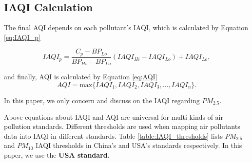 \documentclass[
twocolumn,
]{ceurart}
\begin{document}
\subsection{IAQI Calculation}

The final AQI depends on each pollutant's IAQI, which is calculated by Equation \ref{eq:IAQI_p}

\begin{equation}
    \label{eq:IAQI_p}
    IAQI_p = \frac{C_p-BP_{Lo}}{BP_{Hi}-BP_{Lo}}(IAQI_{Hi}-IAQI_{Lo})+IAQI_{Lo},
\end{equation}

and finally, AQI is calculated by Equation \ref{eq:AQI}
\begin{equation}
    \label{eq:AQI}
    AQI = \text{max}\{IAQI_{1}, IAQI_{2}, IAQI_{3}, ..., IAQI_{n}\}.
\end{equation}

In this paper, we only concern and discuss on the IAQI regarding $PM_{2.5}$.



Above equations about IAQI and AQI are universal for multi kinds of air pollution standards. Different thresholds are used when mapping air pollutants data into IAQI in different standards. Table \ref{table:IAQI_thresholds} lists $PM_{2.5}$ and $PM_{10}$ IAQI thresholds in China's and USA's standards respectively. In this paper, we use the \textbf{USA standard}. 
\end{document}
